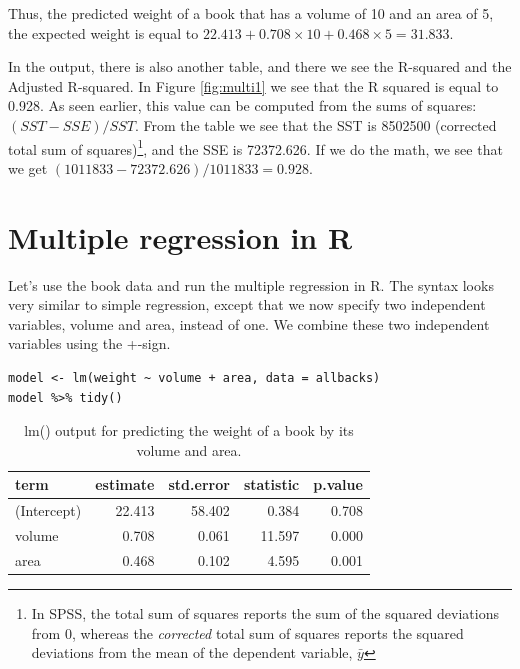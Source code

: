 \documentclass[]{book}\usepackage[]{graphicx}\usepackage[]{color}
\begin{document}
Thus, the predicted weight of a book that has a volume of 10 and an area of 5, the expected weight is equal to $22.413 + 0.708 \times 10 + 0.468 \times 5 = 31.833$.

In the output, there is also another table, and there we see the R-squared and the Adjusted R-squared. In Figure \ref{fig:multi1} we see that the R squared is equal to 0.928. As seen earlier, this value can be computed from the sums of squares: $(SST-SSE)/SST$. From the table we see that the SST is 8502500 (corrected total sum of squares)\footnote{In SPSS, the total sum of squares reports the sum of the squared deviations from 0, whereas the \textit{corrected} total sum of squares reports the squared deviations from the mean of the dependent variable, $\bar{y}$}, and the SSE is 72372.626. If we do the math, we see that we get $(1011833-72372.626)/1011833= 0.928$.





\section{Multiple regression in R}

Let's use the book data and run the multiple regression in R. The syntax looks very similar to simple regression, except that we now specify two independent variables, volume and area, instead of one. We combine these two independent variables using the +-sign.

\begin{lstlisting}
model <- lm(weight ~ volume + area, data = allbacks)
model %>% tidy()
\end{lstlisting}


\begin{table}[ht]
\centering
\caption{lm() output for predicting the weight of a book by its volume and area.} 
\label{tab:out_books_r}
\begin{tabular}{lrrrr}
  \hline
term & estimate & std.error & statistic & p.value \\ 
  \hline
(Intercept) & 22.413 & 58.402 & 0.384 & 0.708 \\ 
  volume & 0.708 & 0.061 & 11.597 & 0.000 \\ 
  area & 0.468 & 0.102 & 4.595 & 0.001 \\ 
   \hline
\end{tabular}
\end{table}
\end{document}
